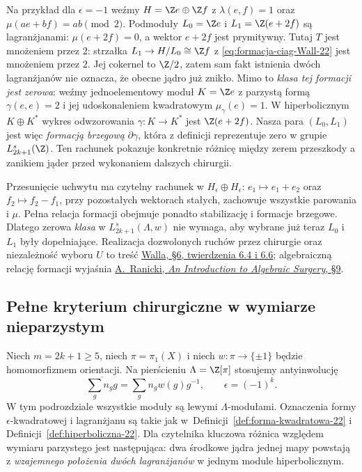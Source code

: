 Na przykład dla $\epsilon=-1$ weźmy
$H=\Z e\oplus\Z f$ z
$\lambda(e,f)=1$ oraz
$\mu(ae+bf)=ab\pmod2$.
Podmoduły $L_0=\Z e$ i
$L_1=\Z(e+2f)$ są lagranżjanami:
$\mu(e+2f)=0$, a wektor $e+2f$
jest prymitywny. Tutaj $T$ jest
mnożeniem przez $2$: strzałka
$L_1\to H/L_0\cong\Z f$ z
\eqref{eq:formacja-ciag-Wall-22} jest
mnożeniem przez $2$. Jej cokernel to
$\Z/2$, zatem sam fakt istnienia dwóch
lagranżjanów nie oznacza, że obecne
jądro już znikło. Mimo to \emph{klasa tej
formacji jest zerowa}: weźmy jednoelementowy
moduł $K=\Z e$ z parzystą formą
$\gamma(e,e)=2$ i jej udoskonaleniem
kwadratowym $\mu_\gamma(e)=1$.
W hiperbolicznym $K\oplus K^*$ wykres
odwzorowania $\gamma:K\to K^*$ jest
$\Z(e+2f)$. Nasza para $(L_0,L_1)$ jest więc
\emph{formacją brzegową} $\partial\gamma$,
która z definicji reprezentuje zero w grupie
$L^s_{2k+1}(\Z)$. Ten rachunek pokazuje
konkretnie różnicę między zerem przeszkody
a zanikiem jąder przed wykonaniem dalszych
chirurgii.

Przesunięcie uchwytu ma czytelny rachunek
w $H_\epsilon\oplus H_\epsilon$:
$e_1\mapsto e_1+e_2$ oraz
$f_2\mapsto f_2-f_1$, przy pozostałych
wektorach stałych, zachowuje wszystkie
parowania i $\mu$. Pełna relacja formacji
obejmuje ponadto stabilizację i formacje
brzegowe. Dlatego zerowa \emph{klasa} w
$L^s_{2k+1}(\Lambda,w)$ nie wymaga, aby
wybrane już teraz $L_0$ i $L_1$ były
dopełniające. Realizacja dozwolonych
ruchów przez chirurgie oraz niezależność
wyboru $U$ to treść
\href{https://webhomes.maths.ed.ac.uk/~v1ranick/books/scm.pdf}
{Walla, §6, twierdzenia 6.4 i 6.6};
algebraiczną relację formacji wyjaśnia
\href{https://www.maths.ed.ac.uk/~v1ranick/papers/ranicki.pdf}
{A.\ Ranicki, \emph{An Introduction to Algebraic Surgery}, §9}.

\subsection*{Pełne kryterium chirurgiczne w wymiarze nieparzystym}

Niech $m=2k+1\geq5$, niech
$\pi=\pi_1(X)$ i niech $w:\pi\to\{\pm1\}$ będzie
homomorfizmem orientacji. Na pierścieniu
$\Lambda=\Z[\pi]$ stosujemy antyinwolucję
\[
 \overline{\sum_g n_g g}=\sum_g n_g w(g)g^{-1},
 \qquad \epsilon=(-1)^k.
\]
W tym podrozdziale wszystkie moduły są lewymi
$\Lambda$-modułami. Oznaczenia formy
$\epsilon$-kwadratowej i lagranżjanu są takie jak
w~Definicji~\ref{def:forma-kwadratowa-22} i
Definicji~\ref{def:hiperboliczna-22}. Dla czytelnika
kluczowa różnica względem wymiaru parzystego jest
następująca: dwa środkowe jądra jednej mapy
powstają z \emph{wzajemnego położenia dwóch
lagranżjanów} w jednym module hiperbolicznym.

